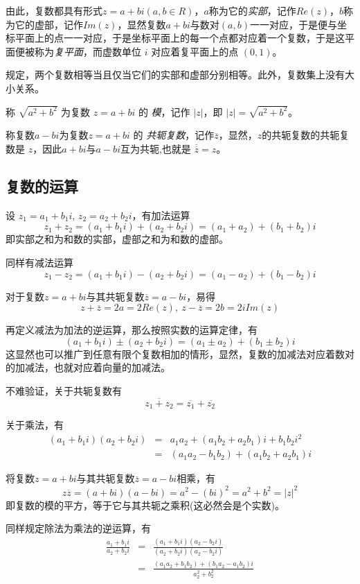 由此，复数都具有形式$z=a+bi(a,b\in R)$，$a$称为它的\emph{实部}，记作$Re(z)$，$b$称为它的虚部，记作$Im(z)$，显然复数$a+bi$与数对$(a,b)$一一对应，于是便与坐标平面上的点一一对应，于是坐标平面上的每一个点都对应着一个复数，于是这平面便被称为\emph{复平面}，而虚数单位 $i$ 对应着复平面上的点 $(0,1)$。

规定，两个复数相等当且仅当它们的实部和虚部分别相等。此外，复数集上没有大小关系。

称 $\sqrt{a^2+b^2}$ 为复数 $z=a+bi$ 的 \emph{模}，记作 $|z|$，即 $|z|=\sqrt{a^2+b^2}$。

称复数$a-bi$为复数$z=a+bi$ 的 \emph{共轭复数}，记作$\overline{z}$，显然，$z$的共轭复数的共轭复数是 $z$，因此$a+bi$与$a-bi$互为共轭,也就是 $\overline{\overline{z}}=z$。


\subsection{复数的运算}
\label{sec:operation-of-complex-number}

设 $z_1=a_1+b_1i$, $z_2=a_2+b_2i$，有加法运算
\[ z_1+z_2 = (a_1+b_1i)+(a_2+b_2i) = (a_1+a_2)+(b_1+b_2)i \]
即实部之和为和数的实部，虚部之和为和数的虚部。

同样有减法运算
\[ z_1-z_2 = (a_1+b_1i)-(a_2+b_2i) = (a_1-a_2)+(b_1-b_2)i \]

对于复数$z=a+bi$与其共轭复数$\overline{z}=a-bi$，易得
\[ z+\overline{z}=2a=2Re(z), \  z-\overline{z}=2b=2iIm(z) \]

再定义减法为加法的逆运算，那么按照实数的运算定律，有
\[ (a_1+b_1i) \pm (a_2+b_2i) = (a_1 \pm a_2) + (b_1 \pm b_2)i \]
这显然也可以推广到任意有限个复数相加的情形，显然，复数的加减法对应着数对的加减法，也就对应着向量的加减法。

不难验证，关于共轭复数有
\[ \overline{z_1+z_2}=\overline{z_1}+\overline{z_2} \]

关于乘法，有
\begin{eqnarray*}
  (a_1+b_1i)(a_2+b_2i) & = & a_1a_2+(a_1b_2+a_2b_1)i + b_1b_2 i^2 \\
  & = & (a_1a_2-b_1b_2) + (a_1b_2+a_2b_1)i
\end{eqnarray*}

将复数$z=a+bi$与其共轭复数$\overline{z}=a-bi$相乘，有
\[ z\overline{z}=(a+bi)(a-bi)=a^2-(bi)^2=a^2+b^2 = |z|^2 \]
即复数的模的平方，等于它与其共轭之乘积(这必然会是个实数)。

同样规定除法为乘法的逆运算，有
\begin{eqnarray*}
  \frac{a_1+b_1i}{a_2+b_2i} & = & \frac{(a_1+b_1i)(a_2-b_2i)}{(a_2+b_2i)(a_2-b_2i)} \\
  & = & \frac{(a_1a_2+b_1b_2)+(b_1a_2-a_1b_2)i}{a_2^2+b_2^2}
\end{eqnarray*}

